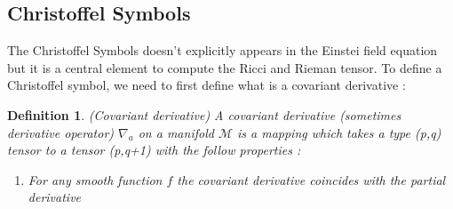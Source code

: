 \documentclass{article}
\begin{document}
        \subsection{Christoffel Symbols}
            The Christoffel Symbols doesn't explicitly appears in the Einstei field equation but it is a central element to compute the Ricci and Rieman tensor.
            To define a Christoffel symbol, we need to first define what is a covariant derivative :
            \newtheorem{mydef}{Definition}
            \begin{mydef}
                (Covariant derivative)
                A covariant derivative (sometimes derivative operator) $\nabla_a$ on a manifold $\mathcal{M}$ is a mapping which takes a type (p,q) tensor to a tensor (p,q+1) with the follow properties :
                \begin{enumerate}
                    \item For any smooth function $f$ the covariant derivative coincides with the partial derivative
                \end{enumerate}
            \end{mydef}
    
\end{document}
